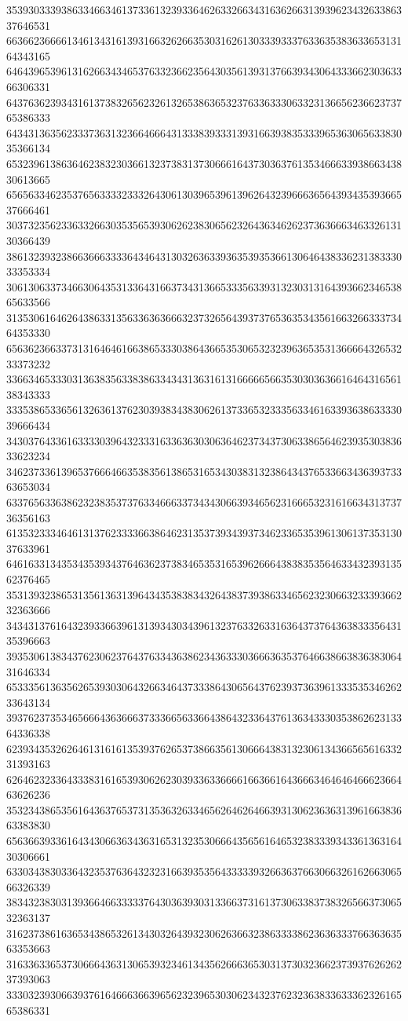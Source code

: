 35393033393863346634613733613239336462633266343163626631393962343263386337646531
66366236666134613431613931663262663530316261303339333763363538363365313164343165
64643965396131626634346537633236623564303561393137663934306433366230363366306331
64376362393431613738326562326132653863653237633633306332313665623662373765386333
64343136356233373631323664666431333839333139316639383533396536306563383035366134
65323961386364623832303661323738313730666164373036376135346663393866343830613665
65656334623537656333323332643061303965396139626432396663656439343539366537666461
30373235623363326630353565393062623830656232643634626237363666346332613130366439
38613239323866366633336434643130326363393635393536613064643833623138333033353334
30613063373466306435313364316637343136653335633931323031316439366234653865633566
31353061646264386331356336363666323732656439373765363534356166326633373464353330
65636236633731316464616638653330386436653530653232396365353136666432653233373232
33663465333031363835633838633434313631613166666566353030363661646431656138343333
33353865336561326361376230393834383062613733653233356334616339363863333039666434
34303764336163333039643233316336363030636462373437306338656462393530383633623234
34623733613965376664663538356138653165343038313238643437653366343639373363653034
63376563363862323835373763346663373434306639346562316665323161663431373736356163
61353233346461313762333366386462313537393439373462336535396130613735313037633961
64616331343534353934376463623738346535316539626664383835356463343239313562376465
35313932386531356136313964343538383432643837393863346562323066323339366232363666
34343137616432393366396131393430343961323763326331636437376436383335643135396663
39353061383437623062376437633436386234363330366636353764663866383638306431646334
65333561363562653930306432663464373338643065643762393736396133353534626233643134
39376237353465666436366637333665633664386432336437613634333035386262313364336338
62393435326264613161613539376265373866356130666438313230613436656561633231393163
62646232336433383161653930626230393363366661663661643666346464646662366463626236
35323438653561643637653731353632633465626462646639313062363631396166383663383830
65636639336164343066363436316531323530666435656164653238333934336136316430306661
63303438303364323537636432323166393535643333393266363766306632616266306566326339
38343238303139366466333337643036393031336637316137306338373832656637306532363137
31623738616365343865326134303264393230626366323863333862363633376636363563353663
31633633653730666436313065393234613435626663653031373032366237393762626237393063
33303239306639376164666366396562323965303062343237623236383363336232616565386331
